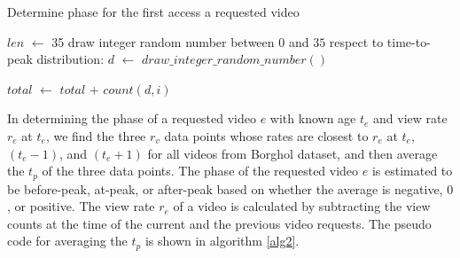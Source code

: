 \documentclass[10pt,final,journal,a4paper]{IEEEtran}
\begin{document}






\begin{algorithm}
\caption{Determine phase for the first access a requested video}
\label{alg3}
\begin{algorithmic}[1]

\STATE $len$ $\leftarrow$ 35 
\STATE draw integer random number between $0$ and $35$ respect to time-to-peak distribution: 
$d$ $\leftarrow$ $draw\_integer\_random\_number()$
\ENDFOR

\STATE $total$ $\leftarrow$ $total$ + $count(d,i)$ 
\ENDFOR
{}
\ELSE
{}
\ENDIF
\end{algorithmic}
\end{algorithm}

In determining the phase of a requested video $e$ with known age $t_e$ and view rate $r_e$ at $t_e$, we find the three $r_v$ data points whose rates are closest to $r_e$ at $t_e$, $(t_e - 1)$, and $(t_e + 1)$ for all videos from Borghol dataset, and then average the $t_p$ of the three data points.
The phase of the requested video $e$ is estimated to be before-peak, at-peak, or after-peak based on whether the average is negative, $0$, or positive.
The view rate $r_e$ of a video is calculated by subtracting the view counts at the time of the current and the previous video requests.
The pseudo code for averaging the $t_p$ is shown in algorithm \ref{alg2}.
\end{document}
